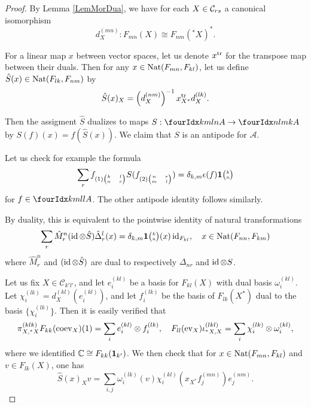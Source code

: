 \begin{proof} By Lemma \ref{LemMorDua}, we have for each $X\in \mathcal{C}_{rs}$ a canonical isomorphism \[d^{(mn)}_X:F_{mn}(X) \cong F_{nm}({}^*X)^*.\] 

For a linear map $x$ between vector spaces, let us denote $x^{\operatorname{\mathrm{tr}}}$ for the transpose map between their duals. Then for any $x\in \operatorname{\mathrm{Nat}}(F_{mn},F_{kl})$, let us define $\hat{S}(x) \in \operatorname{\mathrm{Nat}}(F_{lk},F_{nm})$ by \[\hat{S}(x)_X = \left(d^{(nm)}_X\right)^{-1} x_{X^*}^{\operatorname{\mathrm{tr}}} d_X^{(lk)}.\] %

Then the assigment $\hat{S}$ dualizes to maps $S:\Gr{A}{k}{l}{m}{n} \rightarrow \Gr{A}{n}{m}{l}{k}$ by $S(f)(x) = f(\hat{S}(x))$. We claim that $S$ is an antipode for $\mathscr{A}$. 

Let us check for example the formula \[\sum_r f_{(1){\tiny \begin{pmatrix}k&l\\n & r\end{pmatrix}}} S(f_{(2){\tiny \begin{pmatrix} n & r \\ m & l\end{pmatrix}}}) = \delta_{k,m}\epsilon(f)\mathbf{1}{\tiny {\begin{pmatrix} k\\n\end{pmatrix}}}\] for $f\in \Gr{A}{k}{l}{m}{l}$. The other antipode identity follows similarly.

By duality, this is equivalent to the pointwise identity of natural transformations \[\sum_r\hat{M}^n_r(\operatorname{id}\otimes \hat{S})\hat{\Delta}^l_r(x) = \delta_{k,m}\mathbf{1}{\tiny {\begin{pmatrix} k\\n\end{pmatrix}}}(x) \operatorname{id}_{F_{kl}},\quad x\in \operatorname{\mathrm{Nat}}(F_{nn},F_{km})\] where $\hat{M}^n_r$ and $(\operatorname{id}\otimes \hat{S})$ are dual to respectively $\Delta_{nr}$ and $\operatorname{id}\otimes S$. 

Let us fix $X\in \mathcal{C}_{k'l'}$, and let $e_i^{(kl)}$ be a basis for $F_{kl}(X)$ with dual basis $\omega_i^{(kl)}$. Let $\chi_i^{(lk)} = d_X^{(kl)}(e_i^{(kl)})$, and let $f_i^{(lk)}$ be the basis of $F_{lk}(X^*)$ dual to the basis $\{\chi_i^{(lk)}\}$. Then it is easily verified that \[\pi^{(klk)}_{X,{}^*X}F_{kk}(\mathrm{coev}_{X})(1) = \sum_i e_i^{(kl)}\otimes f_i^{(lk)},\quad F_{ll}(\mathrm{ev}_X)\iota^{(lkl)}_{{}^*X,X} = \sum_i \chi_i^{(lk)}\otimes \omega_i^{(kl)},\] where we identified $\mathbb{C}\cong F_{kk}(\mathbf{1}_{k'})$. We then check that for $x\in \operatorname{\mathrm{Nat}}(F_{mn},F_{kl})$ and $v\in F_{lk}(X)$, one has \[\hat{S}(x)_Xv = \sum_{i,j} \omega_i^{(lk)}(v)\chi_i^{(kl)}(x_{X^*}f_j^{(mn)})e_j^{(nm)}.\] 



\end{proof}
